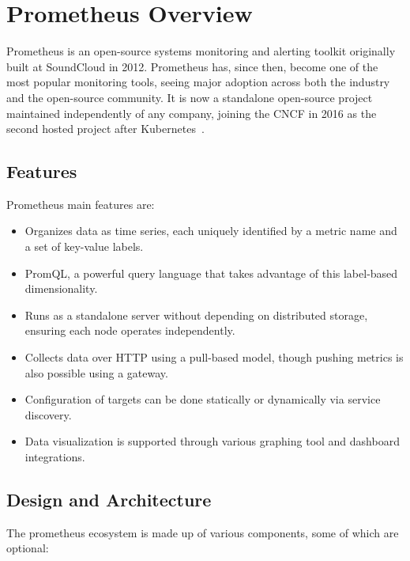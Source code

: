 \section{Prometheus Overview}\label{sec:prometheus-overview}
Prometheus is an open-source systems monitoring and alerting toolkit originally built at SoundCloud in 2012.
Prometheus has, since then, become one of the most popular monitoring tools, seeing major adoption across both the
industry and the open-source community.
It is now a standalone open-source project maintained independently of any company, joining the \ac{CNCF} in 2016 as
the second hosted project after Kubernetes~\cite{what_is_prometheus}.\\

\subsection{Features}\label{subsec:features}

Prometheus main features are:

\begin{itemize}
    \item Organizes data as time series, each uniquely identified by a metric name and a set of key-value labels.
    \item PromQL, a powerful query language that takes advantage of this label-based dimensionality.
    \item Runs as a standalone server without depending on distributed storage, ensuring each node operates
    independently.
    \item Collects data over HTTP using a pull-based model, though pushing metrics is also possible using a gateway.
    \item Configuration of targets can be done statically or dynamically via service discovery.
    \item Data visualization is supported through various graphing tool and dashboard integrations.
\end{itemize}

\subsection{Design and Architecture}\label{subsec:design-and-architecture}

The prometheus ecosystem is made up of various components, some of which are optional:

